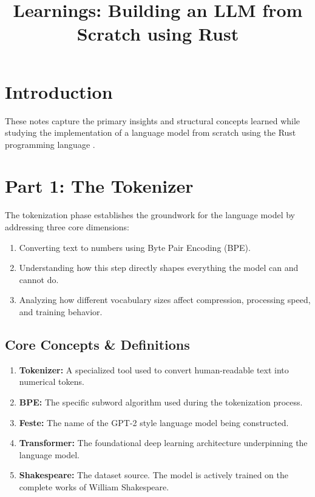 \documentclass{article}
\title{Learnings: Building an LLM from Scratch using Rust}
\author{}
\date{}
\begin{document}
\maketitle

\section*{Introduction}
These notes capture the primary insights and structural concepts learned while studying the implementation of a language model from scratch using the Rust programming language \cite{README.md, Rust_ML__Building_an_LLM_using_Rust_.pdf}.

\section{Part 1: The Tokenizer}

The tokenization phase establishes the groundwork for the language model by addressing three core dimensions:
\begin{enumerate}
    \item Converting text to numbers using Byte Pair Encoding (BPE).
    \item Understanding how this step directly shapes everything the model can and cannot do.
    \item Analyzing how different vocabulary sizes affect compression, processing speed, and training behavior.
\end{enumerate}

\subsection{Core Concepts \& Definitions}
\begin{enumerate}
    \item \textbf{Tokenizer:} A specialized tool used to convert human-readable text into numerical tokens.
    \item \textbf{BPE:} The specific subword algorithm used during the tokenization process.
    \item \textbf{Feste:} The name of the GPT-2 style language model being constructed.
    \item \textbf{Transformer:} The foundational deep learning architecture underpinning the language model.
    \item \textbf{Shakespeare:} The dataset source. The model is actively trained on the complete works of William Shakespeare.
\end{enumerate}
\end{document}

